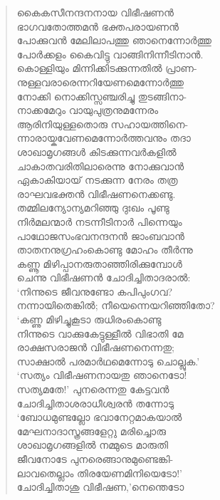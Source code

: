 \begin{verse}
കൈകസീനന്ദനനായ വിഭീഷണന്‍\\
ഭാഗവതോത്തമന്‍ ഭക്തപരായണന്‍\\
പോക്കുവന്‍ മേലിലാപത്തു ഞാനെന്നോര്‍ത്തു\\
പോര്‍ക്കളം കൈവിട്ടു വാങ്ങിനിന്നീടിനാന്‍.\\
കൊള്ളിയും മിന്നിക്കിടക്കുന്നതില്‍ പ്രാണ-\\
നുള്ളവരാരെന്നറിയേണമെന്നോര്‍ത്തു\\
നോക്കി നൊക്കിസ്സഞ്ചരിച്ചു തുടങ്ങിനാ-\\
നാക്കമേറും വായുപുത്രനുമന്നേരം\\
ആരിനിയുള്ളതൊരു സഹായത്തിനെ-\\
ന്നാരായ്കവേണമെന്നോര്‍ത്തവനും തദാ\\
ശാഖാമൃഗങ്ങള്‍ കിടക്കുന്നവര്‍കളില്‍\\
ചാകാതവരിതിലാരെന്നു നോക്കുവാന്‍\\
ഏകാകിയായ് നടക്കുന്ന നേരം തത്ര\\
രാഘവഭക്തന്‍ വിഭീഷണനെക്കണ്ടു.\\
തമ്മിലന്യോന്യമറിഞ്ഞു ദുഃഖം പൂണ്ടു\\
നിര്‍മലന്മാര്‍ നടന്നീടിനാര്‍ പിന്നെയും\\
പാഥോജസംഭവനന്ദനന്‍ ജാംബവാന്‍\\
താതനനുഗ്രഹംകൊണ്ടു മോഹം തീര്‍ന്നു\\
കണ്ണൂ മിഴിപ്പാനരുതാഞ്ഞിരിക്കുമ്പോള്‍\\
ചെന്നു വിഭീഷണന്‍ ചോദിച്ചിതാദരാല്‍:\\
‘നിന്നുടെ ജീവനുണ്ടോ കപിപുംഗവ?\\
നന്നായിതെങ്കില്‍; നീയെന്നെയറിഞ്ഞിതോ?\\
‘കണ്ണു മിഴിച്ചുകൂടാ രുധിരംകൊണ്ടു\\
നിന്നുടെ വാക്കുകേട്ടുള്ളീല്‍ വിഭാതി മേ\\
രാക്ഷസരാജന്‍ വിഭീഷണനെന്നതു;\\
സാക്ഷാല്‍ പരമാര്‍ഥമെന്നോടു ചൊല്ലുക.’\\
‘സത്യം വിഭീഷണനായതു ഞാനെടോ!\\
സത്യമതേ!’ പുനരെന്നതു കേട്ടവന്‍\\
ചോദിച്ചിതാശരാധീശ്വരന്‍ തന്നോടു\\
‘ബോധമുണ്ടല്ലോ ഭവാനേറ്റമാകയാല്‍\\
മേഘനാദാസ്ത്രങ്ങളേറ്റു മരിച്ചൊരു\\
ശാഖാമൃഗങ്ങളില്‍ നമ്മുടെ മാരുതി\\
ജീവനോടേ പുനരെങ്ങാനുമുണ്ടെങ്കി-\\
ലാവതെല്ലാം തിരയേണമിനിയെടോ!’\\
ചോദിച്ചിതാശു വിഭീഷണ,’നെന്തെടോ\\

\end{verse}
